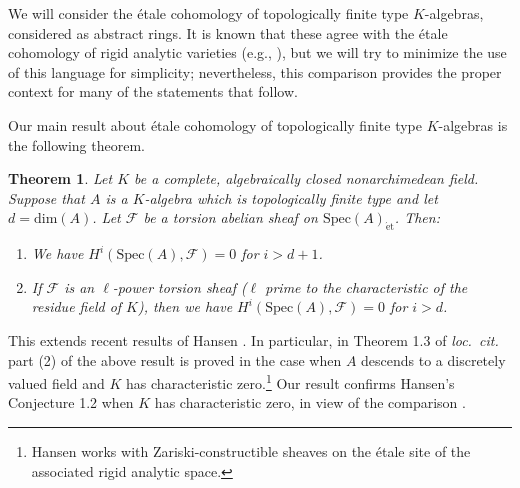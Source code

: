 \documentclass[reqno]{amsart}
\newcommand{\sF}{\mathcal{F}}
\newcommand{\spec}{\mathrm{Spec}}
\newcommand{\et}{\mathrm{\acute{e}t}}
\newtheorem{theorem}{Theorem}[section]
\theoremstyle{definition}
\begin{document}
We will consider the \'etale cohomology of topologically finite type $K$-algebras, considered as
abstract rings. It is known
that these agree with the \'etale cohomology of rigid analytic varieties (e.g., \cite[Theorem
3.2.1]{HuberBook}), but we will try to minimize the use of  this language for simplicity; nevertheless, this comparison provides the proper context for many of the statements that follow.

Our main result about \'etale cohomology of topologically finite type $K$-algebras is the following theorem. 

\begin{theorem} 
\label{rigidartin}
Let $K$ be a complete, algebraically closed nonarchimedean field. 
Suppose that $A$ is a $K$-algebra which is topologically finite type and let $d
=\mathrm{dim}(A)$. Let $\sF$ be a torsion abelian sheaf on $\spec(A)_{\et}$. 
Then:
\begin{enumerate}
\item We have  $H^i( \spec(A), \sF) = 0$ for $i > d+ 1$. 
\item If $\sF$ is an $\ell$-power torsion sheaf ($\ell$ prime to the
characteristic of the residue field of $K$), then we have $H^i( \spec(A), \sF) = 0$ for $i > d$. 
\end{enumerate}
\end{theorem} 


This extends recent results of Hansen \cite{HansenArtin}. In particular, in
Theorem 1.3 of {\em loc.\ cit.} part (2) of  the above result is proved in the case
when $A$ descends to a discretely valued field and $K$ has characteristic
zero.\footnote{Hansen \cite{HansenArtin} works with Zariski-constructible
sheaves on the \'etale site of the associated rigid analytic space.} 
Our result confirms Hansen's Conjecture 1.2 when $K$ has characteristic zero,
in view of the comparison \cite[Theorem 1.7]{HansenArtin}. 
\end{document}
